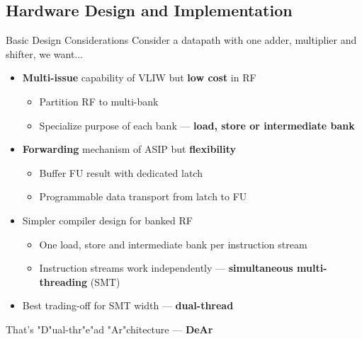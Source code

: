 \documentclass{beamer}
\begin{document}
\begin{CJK}{UTF8}{bkai}
            \subsection{Hardware Design and Implementation}
            \begin{frame}{Basic Design Considerations}
                \pause
                Consider a datapath with one adder, multiplier and shifter, we want... \\
                \begin{itemize}
                    \pause
                    \item \textbf{Multi-issue} capability of VLIW but \textbf{low cost} in RF
                        \begin{itemize}
                            \item Partition RF to multi-bank
                            \item Specialize purpose of each bank --- \textbf{load, store or intermediate bank}
                        \end{itemize}
                    \pause
                    \item \textbf{Forwarding} mechanism of ASIP but \textbf{flexibility}
                        \begin{itemize}
                            \item Buffer FU result with dedicated latch
                            \item Programmable data transport from latch to FU
                        \end{itemize}
                    \pause
                    \item Simpler compiler design for banked RF
                        \begin{itemize}
                            \item One load, store and intermediate bank per instruction stream 
                            \item Instruction streams work independently --- \textbf{simultaneous multi-threading} (SMT)
                        \end{itemize}
                    \pause
                    \item Best trading-off for SMT width --- \textbf{dual-thread}
                \end{itemize}
                \pause
                \begin{center}
                {\large{That's "D"ual-thr"e"ad "Ar"chitecture --- \textbf{DeAr}}}
                \end{center}
            \end{frame}


\end{CJK}
\end{document}
